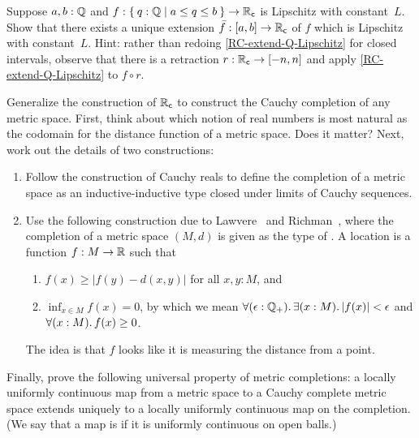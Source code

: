 \begin{ex} \label{RC-Lipschitz-on-interval} Suppose $a, b : \mathbb{Q}$ and $f : \setof{ q : \Q |
    a \leq q \leq b } \to \RC$ is Lipschitz with constant~$L$. Show that there exists a unique
  extension $\bar{f} : [a,b] \to \mathbb{R}_\mathsf{c}$ of $f$ which is Lipschitz with
  constant~$L$. Hint: rather than redoing \autoref{RC-extend-Q-Lipschitz} for closed
  intervals, observe that there is a retraction $r : \mathbb{R}_\mathsf{c} \to [-n,n]$ and apply
  \autoref{RC-extend-Q-Lipschitz} to $f \circ r$.
\end{ex}

\begin{ex} \label{ex:metric-completion}
  Generalize the construction of $\mathbb{R}_\mathsf{c}$ to construct the Cauchy completion of any metric space. First, think about which notion of real numbers is most natural as the codomain for the distance function of a metric space. Does it matter? Next, work out the details of two constructions:
  \begin{enumerate}
  \item Follow the construction of Cauchy reals to define the completion of a metric space as an inductive-inductive type closed under limits of Cauchy sequences.
  \item Use the following construction due to Lawvere~\cite{lawvere:metric-spaces} and Richman~\cite{Richman00thefundamental}, where the completion of a metric space $(M, d)$ is given as the type of .
    A location is a function $f : M \to \mathbb{R}$ such that
    \begin{enumerate}
    \item $f(x) \geq |f(y) - d(x,y)|$ for all $x, y : M$, and
    \item $\inf_{x \in M} f(x) = 0$, by which we mean $\fall{\epsilon : \Qp} \exis{x : M} |f(x)| < \epsilon$ and $\fall{x : M} f(x) \geq 0$.
    \end{enumerate}
    The idea is that $f$ looks like it is measuring the distance from a point.
  \end{enumerate}
  Finally, prove the following universal property of metric completions: a locally uniformly continuous map from a metric space to a Cauchy complete metric space extends uniquely to a locally uniformly continuous map on the completion. (We say that a map is 
  if it is uniformly continuous on open balls.)
\end{ex}

